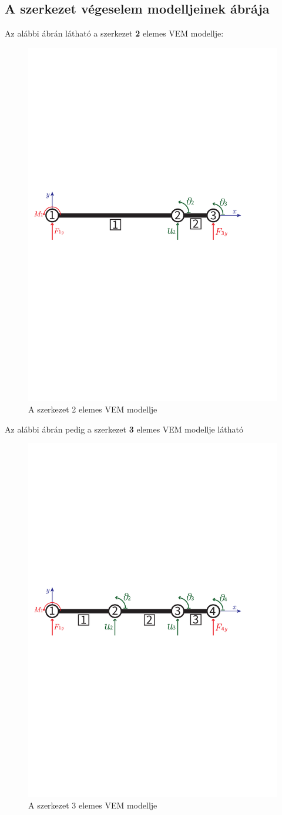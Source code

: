 \documentclass[12pt,a4paper]{article}
\begin{document}
\subsection{A szerkezet végeselem modelljeinek ábrája}
Az alábbi ábrán látható a szerkezet \textbf{2} elemes VEM modellje:
\begin{figure}[H]
    \centering
    \includegraphics[width=0.7\linewidth]{figures/vem_hf2_vemabra_2.pdf}
    \caption{A szerkezet 2 elemes VEM modellje}
\end{figure}
\noindent Az alábbi ábrán pedig a szerkezet \textbf{3} elemes VEM modellje látható
\begin{figure}[H]
    \centering
    \includegraphics[width=0.7\linewidth]{figures/vem_hf2_vemabra_3.pdf}
    \caption{A szerkezet 3 elemes VEM modellje}
\end{figure}
\end{document}
